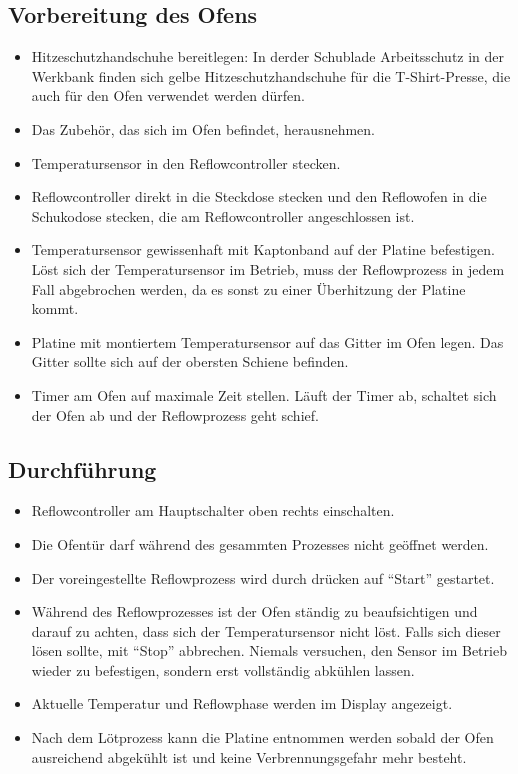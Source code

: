 \documentclass{\basedir/fablab-document}
\begin{document}
\subsection{Vorbereitung des Ofens}
\begin{itemize}
\item Hitzeschutzhandschuhe bereitlegen: In derder Schublade Arbeitsschutz in der Werkbank finden sich gelbe Hitzeschutzhandschuhe für die T-Shirt-Presse, die auch für den Ofen verwendet werden dürfen.
\item Das Zubehör, das sich im Ofen befindet, herausnehmen.
		\item Temperatursensor in den Reflowcontroller stecken.
		\item Reflowcontroller direkt in die Steckdose stecken und den Reflowofen in die Schukodose stecken, die am Reflowcontroller angeschlossen ist.
		\item Temperatursensor gewissenhaft mit Kaptonband auf der Platine befestigen. Löst sich der Temperatursensor im Betrieb, muss der Reflowprozess in jedem Fall abgebrochen werden, da es sonst zu einer Überhitzung der Platine kommt.
		\item Platine mit montiertem Temperatursensor auf das Gitter im Ofen legen. Das Gitter sollte sich auf der obersten Schiene befinden.
		\item Timer am Ofen auf maximale Zeit stellen. Läuft der Timer ab, schaltet sich der Ofen ab und der Reflowprozess geht schief.
\end{itemize}
\subsection{Durchführung}
\begin{itemize}
		\item Reflowcontroller am Hauptschalter oben rechts einschalten.
		\item Die Ofentür darf während des gesammten Prozesses nicht geöffnet werden. 
		\item Der voreingestellte Reflowprozess wird durch drücken auf \enquote{Start} gestartet.
		\item Während des Reflowprozesses ist der Ofen ständig zu beaufsichtigen und darauf zu achten, dass sich der Temperatursensor nicht löst. Falls sich dieser lösen sollte, mit \enquote{Stop} abbrechen. Niemals versuchen, den Sensor im Betrieb wieder zu befestigen, sondern erst vollständig abkühlen lassen.
		\item Aktuelle Temperatur und Reflowphase werden im Display angezeigt.
		\item Nach dem Lötprozess kann die Platine entnommen werden sobald der Ofen ausreichend abgekühlt ist und keine Verbrennungsgefahr mehr besteht.
\end{itemize}
\end{document}
